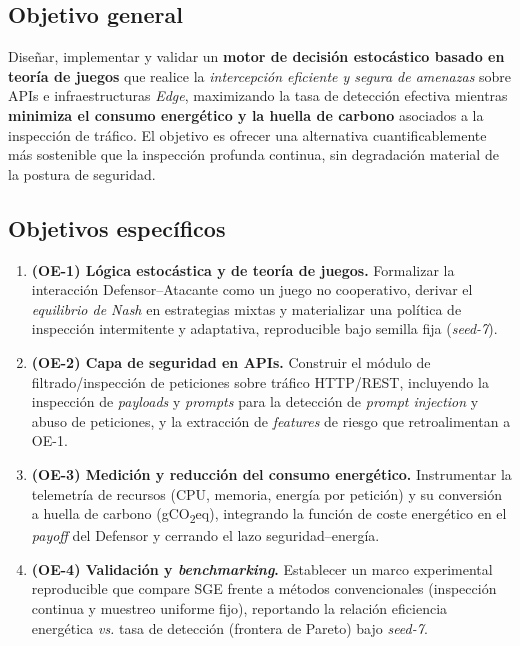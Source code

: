 \documentclass[10pt,twocolumn]{article}
\begin{document}
\subsection{Objetivo general}
Dise\~nar, implementar y validar un \textbf{motor de decisi\'on estoc\'astico basado
en teor\'ia de juegos} que realice la \emph{intercepci\'on eficiente y segura de
amenazas} sobre APIs e infraestructuras \emph{Edge}, maximizando la tasa de
detecci\'on efectiva mientras \textbf{minimiza el consumo energ\'etico y la huella de
carbono} asociados a la inspecci\'on de tr\'afico. El objetivo es ofrecer una
alternativa cuantificablemente m\'as sostenible que la inspecci\'on profunda continua,
sin degradaci\'on material de la postura de seguridad.

\subsection{Objetivos espec\'ificos}
\begin{enumerate}\itemsep2pt
  \item \textbf{(OE-1) L\'ogica estoc\'astica y de teor\'ia de juegos.} Formalizar la
        interacci\'on Defensor--Atacante como un juego no cooperativo, derivar el
        \emph{equilibrio de Nash} en estrategias mixtas y materializar una pol\'itica
        de inspecci\'on intermitente y adaptativa, reproducible bajo semilla fija
        (\emph{seed-7}).
  \item \textbf{(OE-2) Capa de seguridad en APIs.} Construir el m\'odulo de
        filtrado/inspecci\'on de peticiones sobre tr\'afico HTTP/REST, incluyendo la
        inspecci\'on de \emph{payloads} y \emph{prompts} para la detecci\'on de
        \emph{prompt injection} y abuso de peticiones, y la extracci\'on de
        \emph{features} de riesgo que retroalimentan a OE-1.
  \item \textbf{(OE-3) Medici\'on y reducci\'on del consumo energ\'etico.}
        Instrumentar la telemetr\'ia de recursos (CPU, memoria, energ\'ia por
        petici\'on) y su conversi\'on a huella de carbono
        (gCO\textsubscript{2}eq), integrando la funci\'on de coste energ\'etico en el
        \emph{payoff} del Defensor y cerrando el lazo seguridad--energ\'ia.
  \item \textbf{(OE-4) Validaci\'on y \emph{benchmarking}.} Establecer un marco
        experimental reproducible que compare SGE frente a m\'etodos convencionales
        (inspecci\'on continua y muestreo uniforme fijo), reportando la relaci\'on
        eficiencia energ\'etica \emph{vs.} tasa de detecci\'on (frontera de Pareto)
        bajo \emph{seed-7}.
\end{enumerate}
\end{document}
